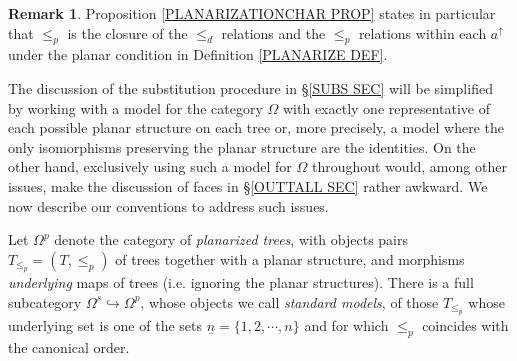 \documentclass[a4paper,10pt
,draft
]{article}%
\numberwithin{equation}{section}
\numberwithin{figure}{section}
\theoremstyle{definition} %
\newtheorem{remark}[equation]{Remark}%
\newcommand{\1}{\ensuremath{\mathbbm 1}}%
\begin{document}
\begin{remark}\label{CLOSURE REM}
Proposition \ref{PLANARIZATIONCHAR PROP} states in particular that $\leq_p$
is the closure of the $\leq_d$ relations  
and the $\leq_p$ relations within each
$a^{\uparrow}$
under the planar condition in 
Definition \ref{PLANARIZE DEF}.
\end{remark}


The discussion of the substitution procedure in \S \ref{SUBS SEC} 
will be simplified by working with 
a model for the category $\Omega$
with exactly one representative
of each possible planar structure on each tree or, more precisely, a model where the only isomorphisms preserving the planar structure are the identities.
On the other hand, exclusively using such a model for $\Omega$ throughout would, among other issues, make the discussion of faces in \S \ref{OUTTALL SEC} rather awkward.
We now describe our conventions to address such issues.

Let $\Omega^p$ denote the category of \textit{planarized trees},
with objects pairs $T_{\leq_p}=(T,\leq_p)$ of trees together with a planar structure,
and morphisms \textit{underlying} maps of trees (i.e. ignoring the planar structures).
There is a full subcategory $\Omega^s \hookrightarrow \Omega^p$, whose objects we call \textit{standard models}, of those $T_{\leq_p}$ whose underlying set is one of the sets $\underline{n} = \{1,2,\cdots,n\}$ and for which $\leq_p$ coincides with the canonical order.
\end{document}
